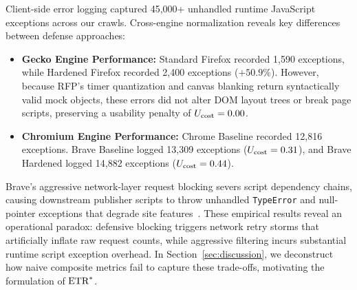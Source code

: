 Client-side error logging captured 45,000+ unhandled runtime JavaScript exceptions across our crawls. Cross-engine normalization reveals key differences between defense approaches:
\begin{itemize}
    \item \textbf{Gecko Engine Performance:} Standard Firefox recorded 1,590 exceptions, while Hardened Firefox recorded 2,400 exceptions ($+50.9\%$). 
However, because RFP's timer quantization and canvas blanking return syntactically valid mock objects, these errors did not alter DOM layout trees or break page scripts, preserving a usability penalty of $U_{\text{cost}} = 0.00$.
    \item \textbf{Chromium Engine Performance:} Chrome Baseline recorded 12,816 exceptions. Brave Baseline logged 13,309 exceptions ($U_{\text{cost}} = 0.31$), and Brave Hardened logged 14,882 exceptions ($U_{\text{cost}} = 0.44$).
\end{itemize}

Brave's aggressive network-layer request blocking severs script dependency chains, causing downstream publisher scripts to throw unhandled \texttt{TypeError} and null-pointer exceptions that degrade site features~\cite{iqbal2020adgraph}. 
These empirical results reveal an operational paradox: defensive blocking triggers network retry storms that artificially inflate raw request counts, while aggressive filtering incurs substantial runtime script exception overhead. In Section~\ref{sec:discussion}, we deconstruct how naive composite metrics fail to capture these trade-offs, motivating the formulation of $\text{ETR}^*$.
